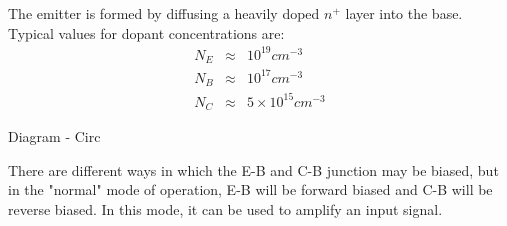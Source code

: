\documentclass[a4paper,12pt]{article}
\begin{document}

The emitter is formed by diffusing a heavily doped $n^{+}$
layer into the base. Typical values for dopant concentrations are: \\

\begin{eqnarray*}
N_{E} & \approx & 10^{19} cm^{-3} \\
N_{B} & \approx & 10^{17} cm^{-3} \\
N_{C} & \approx & 5 \times 10^{15} cm^{-3}
\end{eqnarray*}

\begin{table}[hbtp]

Diagram - Circ

\end{table}

There are different ways in which the E-B and C-B junction may
be biased, but in the "normal" mode of operation, E-B will be forward
biased and C-B will be reverse biased. In this mode, it can be used to
amplify an input signal.
\end{document}
